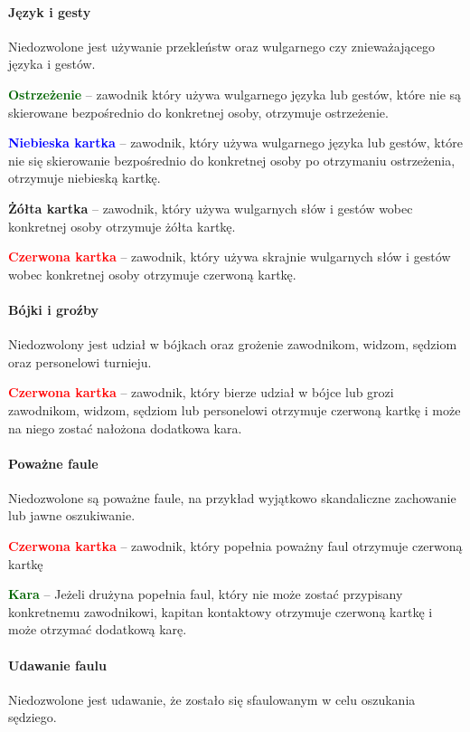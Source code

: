 \documentclass[12pt]{article}
\newcommand\redcard[1]{\bgroup\textcolor{red}{\textbf{#1}}}
\newcommand\yellowcard[1]{\bgroup\textcolor{darkyellow}{\textbf{#1}}}
\newcommand\bluecard[1]{\bgroup\textcolor{blue}{\textbf{#1}}}
\newcommand\other[1]{\bgroup\textcolor{darkgreen}{\textbf{#1}}}
\begin{document}
\paragraph{Język i gesty}
Niedozwolone jest używanie przekleństw
oraz wulgarnego czy znieważającego języka i gestów.

\other{Ostrzeżenie} -- zawodnik który używa wulgarnego języka lub gestów,
które nie są skierowane bezpośrednio do konkretnej osoby, otrzymuje
ostrzeżenie.

\bluecard{Niebieska kartka} -- zawodnik, który używa wulgarnego języka lub
gestów, które nie się skierowanie bezpośrednio do konkretnej osoby po
otrzymaniu ostrzeżenia, otrzymuje niebieską kartkę.

\yellowcard{Żółta kartka} -- zawodnik, który używa wulgarnych słów i gestów
wobec konkretnej osoby otrzymuje żółta kartkę.

\redcard{Czerwona kartka} -- zawodnik, który używa skrajnie wulgarnych słów
i gestów wobec konkretnej osoby otrzymuje czerwoną kartkę.

\paragraph{Bójki i groźby}
Niedozwolony jest udział w bójkach
oraz grożenie zawodnikom, widzom, sędziom oraz personelowi turnieju.

\redcard{Czerwona kartka} -- zawodnik, który bierze udział w bójce lub grozi
zawodnikom, widzom, sędziom lub personelowi otrzymuje czerwoną kartkę i
może na niego zostać nałożona dodatkowa kara.

\paragraph{Poważne faule}
Niedozwolone są poważne faule, na
przykład wyjątkowo skandaliczne zachowanie lub jawne oszukiwanie.

\redcard{Czerwona kartka} -- zawodnik, który popełnia poważny faul otrzymuje
czerwoną kartkę

\other{Kara} -- Jeżeli drużyna popełnia faul, który nie może zostać
przypisany konkretnemu zawodnikowi, kapitan kontaktowy otrzymuje
czerwoną kartkę i może otrzymać dodatkową karę.

\paragraph{Udawanie faulu}
Niedozwolone jest udawanie, że
zostało się sfaulowanym w celu oszukania sędziego.
\end{document}
